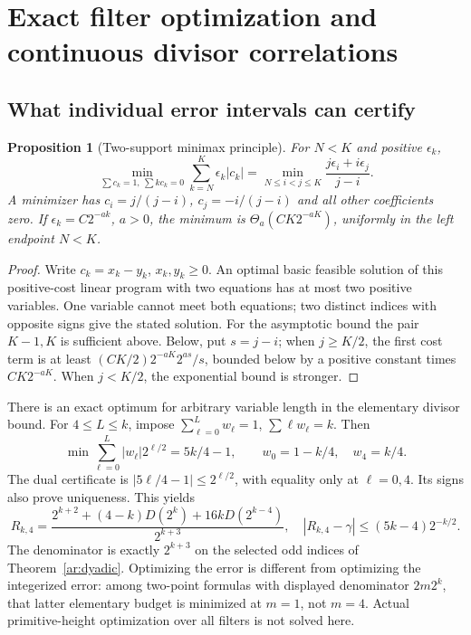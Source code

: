 \documentclass[11pt,a4paper]{article}
\newtheorem{proposition}[theorem]{Proposition}
\theoremstyle{definition}
\theoremstyle{remark}
\numberwithin{equation}{section}
\begin{document}
\section{Exact filter optimization and continuous divisor correlations}
\label{ar:filters}
\subsection{What individual error intervals can certify}
\begin{proposition}[Two-support minimax principle]
\label{ar:minimax}
For $N<K$ and positive $\epsilon_k$,
\[
 \min_{\sum c_k=1,\ \sum kc_k=0}\sum_{k=N}^K\epsilon_k|c_k|
 =\min_{N\le i<j\le K}\frac{j\epsilon_i+i\epsilon_j}{j-i}.
\]
A minimizer has $c_i=j/(j-i)$, $c_j=-i/(j-i)$ and all other coefficients
zero.  If $\epsilon_k=C2^{-ak}$, $a>0$, the minimum is
$\Theta_a(CK2^{-aK})$, uniformly in the left endpoint $N<K$.
\end{proposition}
\begin{proof}
Write $c_k=x_k-y_k$, $x_k,y_k\ge0$.  An optimal basic feasible solution of
this positive-cost linear program with two equations has at most two
positive variables.  One variable cannot meet both equations; two distinct
indices with opposite signs give the stated solution.  For the asymptotic
bound the pair $K-1,K$ is sufficient above.  Below, put $s=j-i$; when
$j\ge K/2$, the first cost term is at least
$(CK/2)2^{-aK}2^{as}/s$, bounded below by a positive constant times
$CK2^{-aK}$.  When $j<K/2$, the exponential bound is stronger.
\end{proof}

There is an exact optimum for arbitrary variable length in the elementary
divisor bound.  For $4\le L\le k$, impose
$\sum_{\ell=0}^Lw_\ell=1$, $\sum\ell w_\ell=k$.  Then
\begin{equation}\label{ar:exactminimax}
 \min\sum_{\ell=0}^L|w_\ell|2^{\ell/2}=5k/4-1,
 \qquad w_0=1-k/4,\quad w_4=k/4.
\end{equation}
The dual certificate is $|5\ell/4-1|\le2^{\ell/2}$, with equality only
at $\ell=0,4$.  Its signs also prove uniqueness.  This yields
\[
 R_{k,4}=\frac{2^{k+2}+(4-k)D(2^k)+16kD(2^{k-4})}{2^{k+3}},
 \quad |R_{k,4}-\gamma|\le(5k-4)2^{-k/2}.
\]
The denominator is exactly $2^{k+3}$ on the selected odd indices of
Theorem~\ref{ar:dyadic}.  Optimizing the error is different from optimizing
the integerized error: among two-point formulas with displayed denominator
$2m2^k$, that latter elementary budget is minimized at $m=1$, not $m=4$.
Actual primitive-height optimization over all filters is not solved here.
\end{document}
